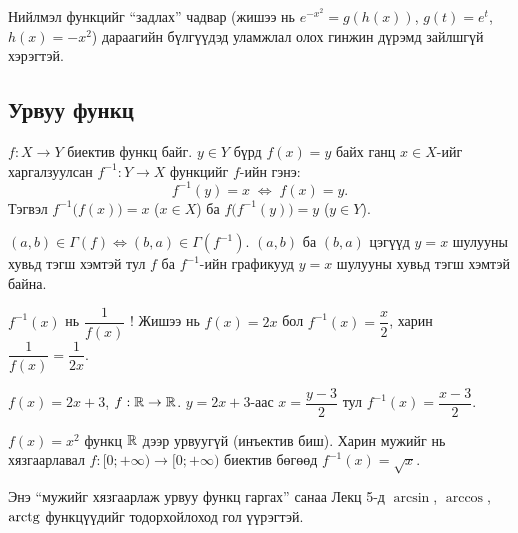\begin{remark}
Нийлмэл функцийг ``задлах'' чадвар (жишээ нь $e^{-x^2}=g(h(x))$, $g(t)=e^t$, $h(x)=-x^2$)
дараагийн бүлгүүдэд уламжлал олох гинжин дүрэмд зайлшгүй хэрэгтэй.
\end{remark}

\subsection{Урвуу функц}
\begin{definition}
$f:X\to Y$ биектив функц байг. $y\in Y$ бүрд $f(x)=y$ байх ганц $x\in X$-ийг
харгалзуулсан $f^{-1}:Y\to X$ функцийг $f$-ийн  гэнэ:
\[
f^{-1}(y)=x \;\Longleftrightarrow\; f(x)=y.
\]
Тэгвэл $f^{-1}\bigl(f(x)\bigr)=x$ \;($x\in X$) ба $f\bigl(f^{-1}(y)\bigr)=y$ \;($y\in Y$).
\end{definition}

\begin{remark}
$(a,b)\in\Gamma(f) \Longleftrightarrow (b,a)\in\Gamma(f^{-1})$. $(a,b)$ ба $(b,a)$ цэгүүд
$y=x$ шулууны хувьд тэгш хэмтэй тул $f$ ба $f^{-1}$-ийн графикууд $y=x$ шулууны хувьд
тэгш хэмтэй байна.
\end{remark}

\begin{remark}
$f^{-1}(x)$ нь $\dfrac{1}{f(x)}$ ! Жишээ нь $f(x)=2x$ бол
$f^{-1}(x)=\dfrac{x}{2}$, харин $\dfrac{1}{f(x)}=\dfrac{1}{2x}$.
\end{remark}

\begin{example}
$f(x)=2x+3$, $f:\mathbb{R}\to\mathbb{R}$. $y=2x+3$-аас $x=\dfrac{y-3}{2}$ тул
$f^{-1}(x)=\dfrac{x-3}{2}$.
\end{example}

\begin{example}
$f(x)=x^2$ функц $\mathbb{R}$ дээр урвуугүй (инъектив биш). Харин мужийг нь хязгаарлавал
$f:[0;+\infty)\to[0;+\infty)$ биектив бөгөөд $f^{-1}(x)=\sqrt{x}$.
\begin{center}
\end{center}
Энэ ``мужийг хязгаарлаж урвуу функц гаргах'' санаа Лекц 5-д $\arcsin$, $\arccos$,
$\operatorname{arctg}$ функцүүдийг тодорхойлоход гол үүрэгтэй.
\end{example}

